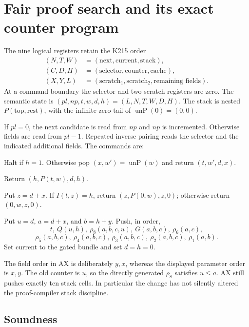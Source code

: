 \documentclass[11pt]{article}
\theoremstyle{definition}\newtheorem{definition}[theorem]{Definition}
\begin{document}
\section{Fair proof search and its exact counter program}

The nine logical registers retain the K215 order
\[
 \begin{aligned}
 (N,T,W)&=(\text{next},\text{current},\text{stack}),\\
 (C,D,H)&=(\text{selector},\text{counter},\text{cache}),\\
 (X,Y,L)&=(\text{scratch}_1,\text{scratch}_2,\text{remaining fields}).
 \end{aligned}
\]
At a command boundary the selector and two scratch registers are zero.
The semantic state is $(pl,np,t,w,d,h)=(L,N,T,W,D,H)$.
The stack is nested $P(\text{top},\text{rest})$, with the infinite
zero tail of $\operatorname{unP}(0)=(0,0)$.

If $pl=0$, the next candidate is read from $np$ and $np$ is incremented.
Otherwise fields are read from $pl-1$. Repeated inverse pairing reads
the selector and the indicated additional fields. The commands are:
\begin{description}[style=nextline,leftmargin=1.2em]
\item[{NIP, fields $[0]$.}]
Halt if $h=1$. Otherwise pop $(x,w')=\operatorname{unP}(w)$ and return
$(t,w',d,x)$.
\item[{DROP, fields $[1]$.}]
Return $(h,P(t,w),d,h)$.
\item[{MP$(x)$, fields $[2,x]$.}]
Put $z=d+x$. If $I(t,z)=h$, return $(z,P(0,w),z,0)$;
otherwise return $(0,w,z,0)$.
\item[{AX$(c;x,y)$, fields $[c+3,y,x]$.}]
Put $u=d$, $a=d+x$, and $b=h+y$. Push, in order,
\[
 t,\ Q(u,h),\ \rho_8(a,b,c,u),\ G(a,b,c),\ \rho_6(a,c),
\]
\[
 \rho_5(a,b,c),\ \rho_4(a,b,c),\ \rho_3(a,b,c),\
 \rho_2(a,b,c),\ \rho_1(a,b).
\]
Set current to the gated bundle and set $d=h=0$.
\end{description}
The field order in AX is deliberately $y,x$, whereas the displayed
parameter order is $x,y$. The old counter is $u$, so the directly
generated $\rho_8$ satisfies $u\le a$. AX still pushes exactly ten
stack cells. In particular the change has not silently altered the
proof-compiler stack discipline.

\subsection{Soundness}
\end{document}
